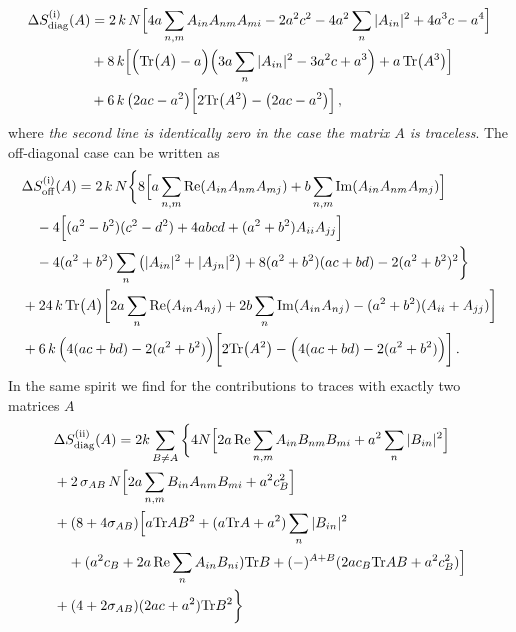 \documentclass[10pt,a4paper]{article}
\newcommand{\RN}[1]{%
    \textup{\uppercase\expandafter{\romannumeral#1}}%
}
\newcommand{\Tr}{\mathrm{Tr}\vspace{-2pt}}
\begin{document}
\begin{align}
  \Delta S^{(\RN{1})}_{\mathrm{diag}} (A) &=
    2 \, k \, N
    \Big[
      4 a \sum_{n,m} A_{in} A_{nm} A_{mi}
      - 2 a^2 c^2
      - 4 a^2 \sum_n |A_{in}|^2
      + 4 a^3 c
      - a^4
  \Big]
  \nonumber \\
  &+8 \, k
  \Big[
    \Big( \Tr \big( A \big) - a \Big)
    \Big(
      3 a \sum_n |A_{in}|^2
      - 3 a^2 c
      + a^3
    \Big)
    + a \, \Tr \big( A^3 \big)
  \Big]
  \nonumber \\
  &+6 \, k \, \big( 2 a c - a^2 \big)
  \Big[
    2 \Tr \big( A^2 \big)
    - \big( 2 a c - a^2 \big)
  \Big]
 \,,
\end{align}
where
\textit{the second line is identically zero in the case the matrix $A$ is traceless}.
The off-diagonal case can be written as
\begin{align}
  &\Delta S^{(\RN{1})}_{\mathrm{off}} (A) = 2 \, k  \, N
  \bigg\{
    8
    \Big[
      a \sum_{n,m} \operatorname{Re} (A_{in} A_{nm} A_{mj}) +
      b \sum_{n,m} \operatorname{Im} (A_{in} A_{nm} A_{mj})
    \Big]
    \nonumber \\
    &\quad-4
    \Big[
      (a^2-b^2)(c^2-d^2)
      + 4 a b c d
      + ( a^2 + b^2 ) A_{ii} A_{jj}
    \Big]
    \nonumber \\
    &\quad-4 (a^2+b^2) \sum_n \left( |A_{in}|^2 + |A_{jn}|^2 \right)
    + 8 (a^2+b^2)(ac+bd)
    - 2 (a^2+b^2)^2
  \bigg\}
  \nonumber \\
  &+24 \, k  \, \Tr \big( A \big)
  \bigg[
    2 a \sum_n \operatorname{Re} (A_{in} A_{nj})
    + 2 b \sum_n \operatorname{Im} (A_{in} A_{nj})
    - (a^2+b^2) (A_{ii}+A_{jj})
  \bigg]
  \nonumber \\
  &+6 \, k \,
  \Big( 4 ( ac + bd ) - 2 ( a^2 + b^2 ) \Big)
  \bigg[
    2 \Tr \big( A^2 \big)
    -
    \Big( 4 ( ac + bd ) - 2 ( a^2 + b^2 ) \Big)
  \bigg] \,.
\end{align}
In the same spirit we find for the
contributions to traces with exactly two matrices $A$
\begin{align}
  &\Delta S^{(\RN{2})}_{\mathrm{diag}} (A) =
  2k \sum_{B \neq A} \bigg\{ 4N \Big[
      2 a \operatorname{Re} \sum_{n,m} A_{in} B_{nm} B_{mi}
      + a^2 \sum_n |B_{in}|^2
  \Big]\\
  &+2 \, \sigma_{AB}\,N   \Big[
      2 a \sum_{n,m} B_{in} A_{nm} B_{mi}
      + a^2 c_B^2
  \Big]\\
  &+ (8+4\sigma_{AB}) \Big[
    a \Tr AB^2 + (a\Tr A +a^2) \sum_n |B_{in}|^2 \\
    &\quad+ (a^2 c_B + 2a \operatorname{Re} \sum_n A_{in} B_{ni} ) \Tr B
    + (-)^{A+B} (2 a c_B \Tr AB + a^2 c_B^2)
  \Big] \\
  &+ (4+2\sigma_{AB})(2ac+a^2) \Tr B^2
 \bigg\}
\end{align}
\end{document}
